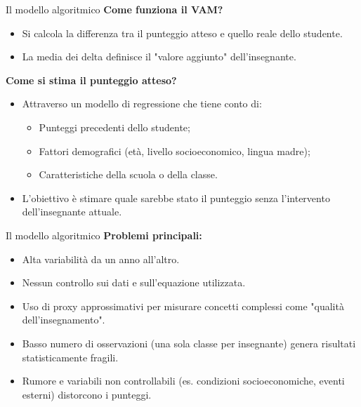 \documentclass{beamer}
\begin{document}
\begin{frame}{Il modello algoritmico}
\textbf{Come funziona il VAM?}
\begin{itemize}
  \item Si calcola la differenza tra il punteggio atteso e quello reale dello studente.
  \item La media dei delta definisce il "valore aggiunto" dell'insegnante.
\end{itemize}

\textbf{Come si stima il punteggio atteso?}
\begin{itemize}
  \item Attraverso un modello di regressione che tiene conto di:
  \begin{itemize}
    \item Punteggi precedenti dello studente;
    \item Fattori demografici (et\`a, livello socioeconomico, lingua madre);
    \item Caratteristiche della scuola o della classe.
  \end{itemize}
  \item L'obiettivo \`e stimare quale sarebbe stato il punteggio senza l'intervento dell'insegnante attuale.
\end{itemize}
\end{frame}
%
%
\begin{frame}{Il modello algoritmico}
\textbf{Problemi principali:}
\begin{itemize}
  \item Alta variabilit\`a da un anno all'altro.
  \item Nessun controllo sui dati e sull'equazione utilizzata.
  \item Uso di proxy approssimativi per misurare concetti complessi come "qualit\`a dell'insegnamento".
  \item Basso numero di osservazioni (una sola classe per insegnante) genera risultati statisticamente fragili.
  \item Rumore e variabili non controllabili (es. condizioni socioeconomiche, eventi esterni) distorcono i punteggi.
\end{itemize}
\end{frame}
%
%
\end{document}
